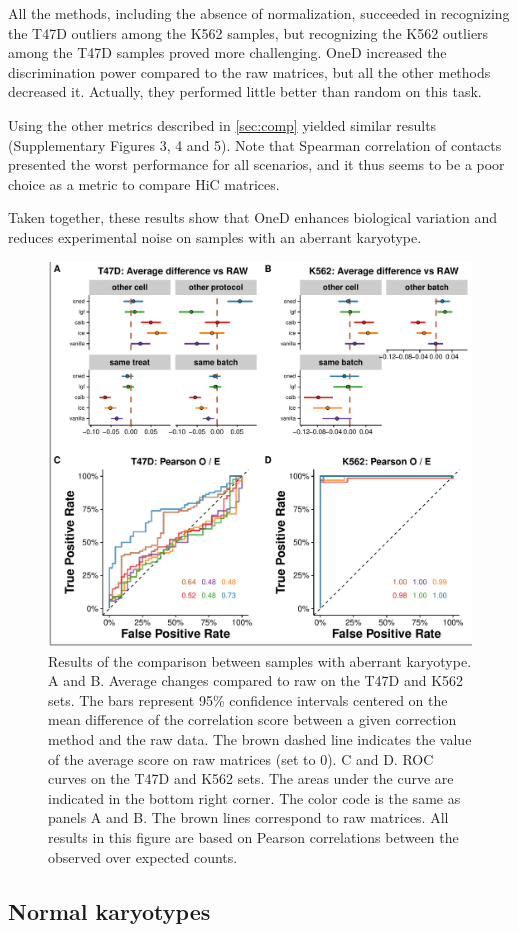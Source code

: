 \documentclass{bioinfo}
\begin{document}
All the methods, including the absence of normalization, succeeded in
recognizing the T47D outliers among the K562 samples, but recognizing the
K562 outliers among the T47D samples proved more challenging. OneD
increased the discrimination power compared to the raw matrices, but all
the other methods decreased it. Actually, they performed little better
than random on this task.

Using the other metrics described in \ref{sec:comp} yielded similar
results (Supplementary Figures 3, 4 and 5). Note that Spearman correlation
of contacts presented the worst performance for all scenarios, and it thus
seems to be a poor choice as a metric to compare HiC matrices.

Taken together, these results show that OneD enhances biological variation
and reduces experimental noise on samples with an aberrant karyotype.


\begin{figure}
\centerline{\includegraphics[width=.50\textwidth]{img/correlation_aberrant_figure3.pdf}}
\caption{
Results of the comparison between samples with aberrant karyotype. A and
B. Average changes compared to raw on the T47D and K562 sets. The bars
represent 95\% confidence intervals centered on the mean difference of the
correlation score between a given correction method and the raw data. The
brown dashed line indicates the value of the average score on raw matrices
(set to 0). C and D. ROC curves on the T47D and K562 sets. The areas under
the curve are indicated in the bottom right corner. The color code is the
same as panels A and B. The brown lines correspond to raw matrices. All
results in this figure are based on Pearson correlations between the
observed over expected counts.}
\label{fig:aberrant}
\end{figure}



\subsection{Normal karyotypes}
\end{document}
